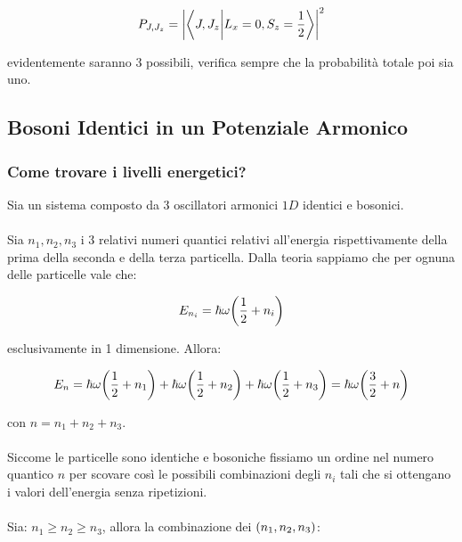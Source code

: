 \begin{align*}
	P_{J, J_z} = \qty|\braket{J, J_z}{L_x = 0, S_z = \frac{1}{2}}|^2
\end{align*}

	evidentemente saranno $3$ possibili, verifica sempre che la probabilità totale poi sia uno.

\subsection{Bosoni Identici in un Potenziale Armonico}

\subsubsection{Come trovare i livelli energetici?}

	Sia un sistema composto da 3 oscillatori armonici $1D$ identici e bosonici.
	\\
	\\
	Sia $n_1, n_2, n_3$ i 3 relativi numeri quantici relativi all'energia rispettivamente della prima della seconda e della terza particella. Dalla teoria sappiamo che per ognuna delle particelle vale che:
	
\begin{align*}
	E_{n_i} = \hbar \omega \qty(\frac{1}{2} + n_i) 
\end{align*}
	
	esclusivamente in 1 dimensione. Allora:
	
\begin{align*}
	E_{n} =\hbar \omega \qty(\frac{1}{2} + n_1) + \hbar \omega \qty(\frac{1}{2} + n_2) + \hbar \omega \qty(\frac{1}{2} + n_3) = \hbar \omega \qty(\frac{3}{2} + n) 
\end{align*}
	
	con $n = n_1 + n_2 + n_3$.
	\\
	\\
	Siccome le particelle sono identiche e bosoniche fissiamo un ordine nel numero quantico $n$ per scovare così le possibili combinazioni degli $n_i$ tali che si ottengano i valori dell'energia senza ripetizioni.
	\\
	\\
	Sia: $n_1 \geq n_2 \geq n_3$, allora la combinazione dei $\qty(n_1, n_2, n_3)$:
	
